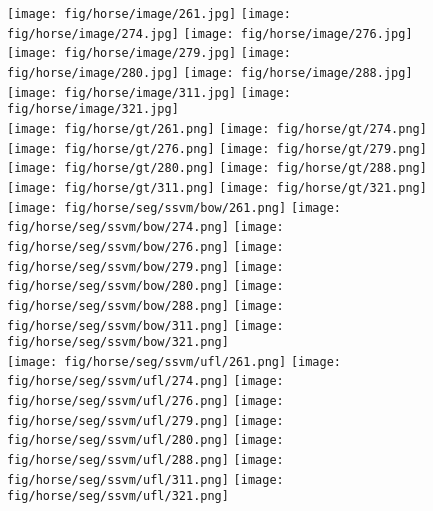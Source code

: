 \documentclass[10pt,3p]{elsarticle}
\begin{document}
\begin{figure}[t]
\centering
%
    \texttt{[image: fig/horse/image/261.jpg]}
     \texttt{[image: fig/horse/image/274.jpg]}
     \texttt{[image: fig/horse/image/276.jpg]}       
	\texttt{[image: fig/horse/image/279.jpg]}                  
    \texttt{[image: fig/horse/image/280.jpg]}
     \texttt{[image: fig/horse/image/288.jpg]}  
     \texttt{[image: fig/horse/image/311.jpg]}   
     \texttt{[image: fig/horse/image/321.jpg]} \\
     
     \texttt{[image: fig/horse/gt/261.png]}
     \texttt{[image: fig/horse/gt/274.png]}
     \texttt{[image: fig/horse/gt/276.png]}       
	\texttt{[image: fig/horse/gt/279.png]}                  
    \texttt{[image: fig/horse/gt/280.png]}
     \texttt{[image: fig/horse/gt/288.png]}  
     \texttt{[image: fig/horse/gt/311.png]}   
     \texttt{[image: fig/horse/gt/321.png]} \\
     
%
%
%
%
%
%
%
%
     
     \texttt{[image: fig/horse/seg/ssvm/bow/261.png]}
     \texttt{[image: fig/horse/seg/ssvm/bow/274.png]}
     \texttt{[image: fig/horse/seg/ssvm/bow/276.png]}       
	\texttt{[image: fig/horse/seg/ssvm/bow/279.png]}                  
    \texttt{[image: fig/horse/seg/ssvm/bow/280.png]}
     \texttt{[image: fig/horse/seg/ssvm/bow/288.png]}  
     \texttt{[image: fig/horse/seg/ssvm/bow/311.png]}   
     \texttt{[image: fig/horse/seg/ssvm/bow/321.png]} \\
     
     \texttt{[image: fig/horse/seg/ssvm/ufl/261.png]}
     \texttt{[image: fig/horse/seg/ssvm/ufl/274.png]}
     \texttt{[image: fig/horse/seg/ssvm/ufl/276.png]}       
	\texttt{[image: fig/horse/seg/ssvm/ufl/279.png]}                  
    \texttt{[image: fig/horse/seg/ssvm/ufl/280.png]}
     \texttt{[image: fig/horse/seg/ssvm/ufl/288.png]}  
     \texttt{[image: fig/horse/seg/ssvm/ufl/311.png]}   
     \texttt{[image: fig/horse/seg/ssvm/ufl/321.png]} \\
     

\end{figure}
\end{document}
